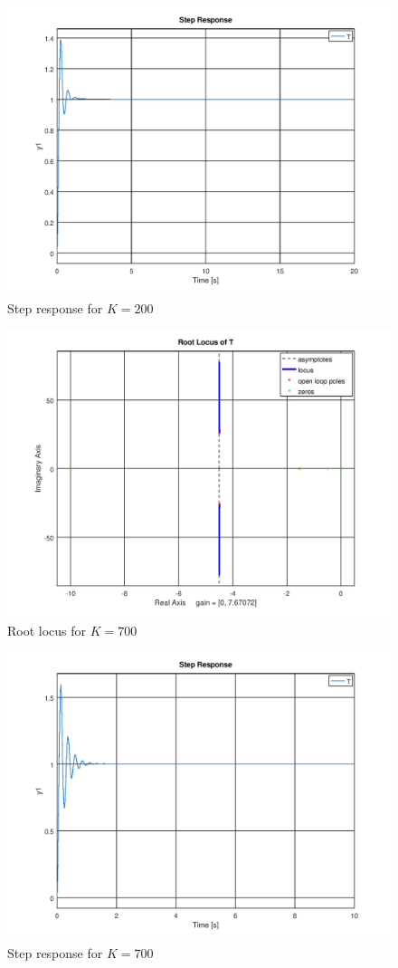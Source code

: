 \documentclass[12pt, a4paper]{article}
\begin{document}
		\begin{figure}[H]
			\centering
			\includegraphics[width=.8\textwidth]{img/step_200.png}
			\caption{Step response for $K = 200$}
			\label{fig:step_200}
		\end{figure}

		\begin{figure}[H]
			\centering
			\includegraphics[width=.8\textwidth]{img/rlocus_700.png}
			\caption{Root locus for $K = 700$}
			\label{fig:rlocus_700}
		\end{figure}

		\begin{figure}[H]
			\centering
			\includegraphics[width=.8\textwidth]{img/step_700.png}
			\caption{Step response for $K = 700$}
			\label{fig:step_700}
		\end{figure}
\end{document}
